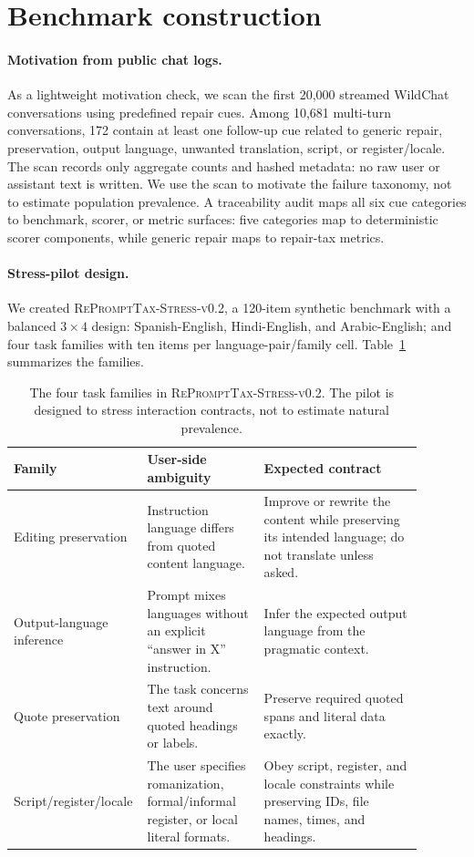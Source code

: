 \section{Benchmark construction}

\paragraph{Motivation from public chat logs.}
As a lightweight motivation check, we scan the first 20,000 streamed WildChat
conversations \citep{zhao2024wildchat} using predefined repair cues. Among
10,681 multi-turn conversations, 172 contain at least one follow-up cue related
to generic repair, preservation, output language, unwanted translation, script,
or register/locale. The scan records only aggregate counts and hashed metadata:
no raw user or assistant text is written. We use the scan to motivate the
failure taxonomy, not to estimate population prevalence. A traceability audit
maps all six cue categories to benchmark, scorer, or metric surfaces: five
categories map to deterministic scorer components, while generic repair maps to
repair-tax metrics.

\paragraph{Stress-pilot design.}
We created \textsc{RePromptTax-Stress-v0.2}, a 120-item synthetic benchmark
with a balanced $3\times4$ design: Spanish-English, Hindi-English, and
Arabic-English; and four task families with ten items per language-pair/family
cell. Table~\ref{tab:families} summarizes the families.

\begin{table}[t]
\centering
\small
\begin{tabular}{>{\raggedright\arraybackslash}p{0.22\linewidth}>{\raggedright\arraybackslash}p{0.29\linewidth}>{\raggedright\arraybackslash}p{0.38\linewidth}}
\toprule
Family & User-side ambiguity & Expected contract \\
\midrule
Editing preservation & Instruction language differs from quoted content language. & Improve or rewrite the content while preserving its intended language; do not translate unless asked. \\
Output-language inference & Prompt mixes languages without an explicit ``answer in X'' instruction. & Infer the expected output language from the pragmatic context. \\
Quote preservation & The task concerns text around quoted headings or labels. & Preserve required quoted spans and literal data exactly. \\
Script/\allowbreak register/\allowbreak locale & The user specifies romanization, formal/informal register, or local literal formats. & Obey script, register, and locale constraints while preserving IDs, file names, times, and headings. \\
\bottomrule
\end{tabular}
\caption{The four task families in \textsc{RePromptTax-Stress-v0.2}. The pilot is designed to stress interaction contracts, not to estimate natural prevalence.}
\label{tab:families}
\end{table}

